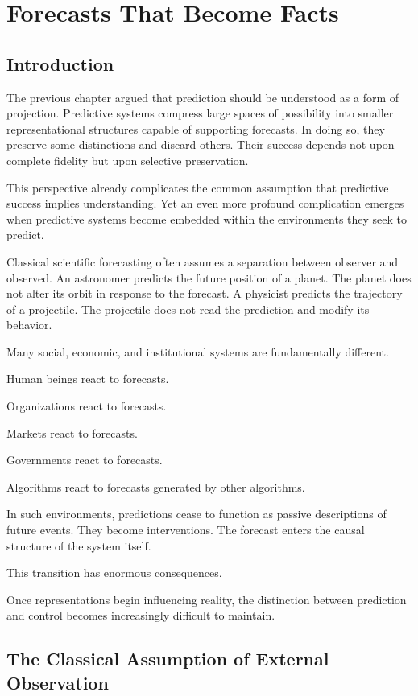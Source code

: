 \documentclass[11pt,oneside,openany]{book}
\begin{document}
\chapter{Forecasts That Become Facts}

\section{Introduction}

The previous chapter argued that prediction should be understood as a form of projection. Predictive systems compress large spaces of possibility into smaller representational structures capable of supporting forecasts. In doing so, they preserve some distinctions and discard others. Their success depends not upon complete fidelity but upon selective preservation.

This perspective already complicates the common assumption that predictive success implies understanding. Yet an even more profound complication emerges when predictive systems become embedded within the environments they seek to predict.

Classical scientific forecasting often assumes a separation between observer and observed. An astronomer predicts the future position of a planet. The planet does not alter its orbit in response to the forecast. A physicist predicts the trajectory of a projectile. The projectile does not read the prediction and modify its behavior.

Many social, economic, and institutional systems are fundamentally different.

Human beings react to forecasts.

Organizations react to forecasts.

Markets react to forecasts.

Governments react to forecasts.

Algorithms react to forecasts generated by other algorithms.

In such environments, predictions cease to function as passive descriptions of future events. They become interventions. The forecast enters the causal structure of the system itself.

This transition has enormous consequences.

Once representations begin influencing reality, the distinction between prediction and control becomes increasingly difficult to maintain.

\section{The Classical Assumption of External Observation}
\end{document}

